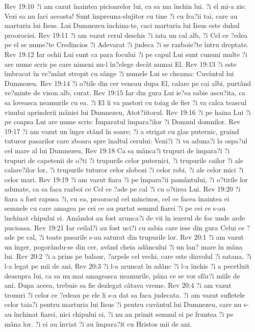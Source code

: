 Rev 19:10  ?i am cazut înaintea picioarelor lui, ca sa ma închin lui. ?i el mi-a zis: Vezi sa nu faci aceasta! Sunt împreuna-slujitor cu tine ?i cu fra?ii tai, care au marturia lui Iisus. Lui Dumnezeu închina-te, caci marturia lui Iisus este duhul proorociei.
Rev 19:11  ?i am vazut cerul deschis ?i iata un cal alb, ?i Cel ce ?edea pe el se nume?te Credincios ?i Adevarat ?i judeca ?i se razboie?te întru dreptate.
Rev 19:12  Iar ochii Lui sunt ca para focului ?i pe capul Lui sunt cununi multe ?i are nume scris pe care nimeni nu-l în?elege decât numai El.
Rev 19:13  ?i este îmbracat în ve?mânt stropit cu sânge ?i numele Lui se cheama: Cuvântul lui Dumnezeu.
Rev 19:14  ?i o?tile din cer veneau dupa El, calare pe cai albi, purtând ve?minte de vison alb, curat.
Rev 19:15  Iar din gura Lui ie?ea sabie ascu?ita, ca sa loveasca neamurile cu ea. ?i El îi va pastori cu toiag de fier ?i va calca teascul vinului aprinderii mâniei lui Dumnezeu, Atot?iitorul.
Rev 19:16  ?i pe haina Lui ?i pe coapsa Lui are nume scris: Împaratul împara?ilor ?i Domnul domnilor.
Rev 19:17  ?i am vazut un înger stând în soare; ?i a strigat cu glas puternic, graind tuturor pasarilor care zboara spre înaltul cerului: Veni?i ?i va aduna?i la ospa?ul cel mare al lui Dumnezeu,
Rev 19:18  Ca sa mânca?i trupuri de împara?i ?i trupuri de capetenii de o?ti ?i trupurile celor puternici, ?i trupurile cailor ?i ale calare?ilor lor, ?i trupurile tuturor celor slobozi ?i celor robi, ?i ale celor mici ?i celor mari.
Rev 19:19  ?i am vazut fiara ?i pe împara?ii pamântului, ?i o?tirile lor adunate, ca sa faca razboi ce Cel ce ?ade pe cal ?i cu o?tirea Lui.
Rev 19:20  ?i fiara a fost rapusa ?i, cu ea, proorocul cel mincinos, cel ce facea înaintea ei semnele cu care amagea pe cei ce au purtat semnul fiarei ?i pe cei ce s-au închinat chipului ei. Amândoi au fost arunca?i de vii în iezerul de foc unde arde pucioasa.
Rev 19:21  Iar ceilal?i au fost uci?i cu sabia care iese din gura Celui ce ?ade pe cal, ?i toate pasarile s-au saturat din trupurile lor.
Rev 20:1  ?i am vazut un înger, pogorându-se din cer, având cheia adâncului ?i un lan? mare în mâna lui.
Rev 20:2  ?i a prins pe balaur, ?arpele cel vechi, care este diavolul ?i satana, ?i l-a legat pe mii de ani,
Rev 20:3  ?i l-a aruncat în adânc ?i l-a închis ?i a pecetluit deasupra lui, ca sa nu mai amageasca neamurile, pâna ce se vor sfâr?i miile de ani. Dupa aceea, trebuie sa fie dezlegat câtava vreme.
Rev 20:4  ?i am vazut tronuri ?i celor ce ?edeau pe ele li s-a dat sa faca judecata. ?i am vazut sufletele celor taia?i pentru marturia lui Iisus ?i pentru cuvântul lui Dumnezeu, care nu s-au închinat fiarei, nici chipului ei, ?i nu au primit semnul ei pe fruntea ?i pe mâna lor. ?i ei au înviat ?i au împara?it cu Hristos mii de ani.
